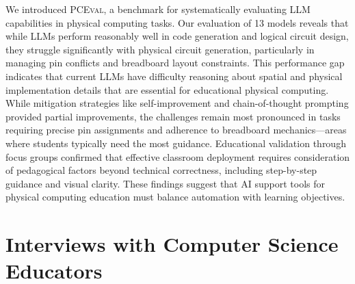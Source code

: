 \documentclass{article} %
\begin{document}
We introduced \textsc{PCEval}, a benchmark for systematically evaluating LLM capabilities in physical computing tasks.
Our evaluation of 13 models reveals that while LLMs perform reasonably well in code generation and logical circuit design, they struggle significantly with physical circuit generation, particularly in managing pin conflicts and breadboard layout constraints.
This performance gap indicates that current LLMs have difficulty reasoning about spatial and physical implementation details that are essential for educational physical computing.
While mitigation strategies like self-improvement and chain-of-thought prompting provided partial improvements, the challenges remain most pronounced in tasks requiring precise pin assignments and adherence to breadboard mechanics—areas where students typically need the most guidance.
Educational validation through focus groups confirmed that effective classroom deployment requires consideration of pedagogical factors beyond technical correctness, including step-by-step guidance and visual clarity.
These findings suggest that AI support tools for physical computing education must balance automation with learning objectives.

\appendix
\section{Interviews with Computer Science Educators} \label{Appendix:Interview}
\end{document}

